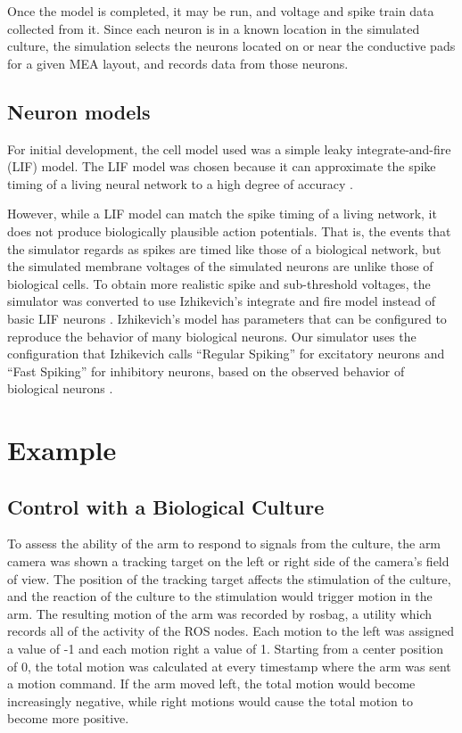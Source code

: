 \documentclass[letterpaper]{article}
\begin{document}
Once the model is completed, it may be run, and voltage and spike train data collected from it. 
Since each neuron is in a known location in the simulated culture, the simulation selects the neurons located on or near the conductive pads for a given MEA layout, and records data from those neurons. 

\subsection{Neuron models}

For initial development, the cell model used was a simple leaky integrate-and-fire (LIF) model. 
The LIF model was chosen because it can approximate the spike timing of a living neural network to a high degree of accuracy \cite{kahng2007stochastic,jolivet2004generalized}. 

However, while a LIF model can match the spike timing of a living network, it does not produce biologically plausible action potentials. 
That is, the events that the simulator regards as spikes are timed like those of a biological network, but the simulated membrane voltages of the simulated neurons are unlike those of biological cells. 
To obtain more realistic spike and sub-threshold voltages, the simulator was converted to use Izhikevich's integrate and fire model instead of basic LIF neurons \cite{izhikevich2003simple}.
Izhikevich's model has parameters that can be configured to reproduce the behavior of many biological neurons. 
Our simulator uses the configuration that Izhikevich calls ``Regular Spiking'' for excitatory neurons and ``Fast Spiking'' for inhibitory neurons, based on the observed behavior of biological neurons \cite{Izhikevich01082004}.

\section{Example}

\subsection{Control with a Biological Culture} 

To assess the ability of the arm to respond to signals from the culture, the arm camera was shown a tracking target on the left or right side of the camera's field of view.
The position of the tracking target affects the stimulation of the culture, and the reaction of the culture to the stimulation would trigger motion in the arm. 
The resulting motion of the arm was recorded by rosbag, a utility which records all of the activity of the ROS nodes. 
Each motion to the left was assigned a value of -1 and each motion right a value of 1. 
Starting from a center position of 0, the total motion was calculated at every timestamp where the arm was sent a motion command. 
If the arm moved left, the total motion would become increasingly negative, while right motions would cause the total motion to become more positive. 
\end{document}
